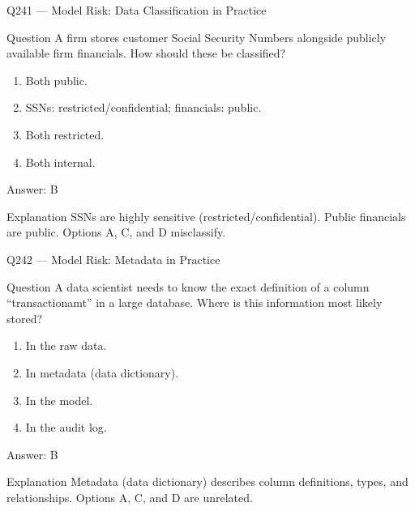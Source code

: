 \documentclass[aspectratio=169,8pt]{beamer}
\begin{document}
																											\begin{frame}{Q241 --- Model Risk: Data Classification in Practice}
																												\begin{block}{Question}
																													A firm stores customer Social Security Numbers alongside publicly available firm financials. How should these be classified?
																													\begin{enumerate}
																														\item Both public.
																														\item SSNs: restricted/confidential; financials: public.
																														\item Both restricted.
																														\item Both internal.
																													\end{enumerate}  \end{block}
																													\begin{exampleblock}{Answer: B}\end{exampleblock}
																													\begin{block}{Explanation}
																														SSNs are highly sensitive (restricted/confidential). Public financials are public. Options A, C, and D misclassify.
																													\end{block}
																												\end{frame}
																												
																												\begin{frame}{Q242 --- Model Risk: Metadata in Practice}
																													\begin{block}{Question}
																														A data scientist needs to know the exact definition of a column ``transactionamt'' in a large database. Where is this information most likely stored?
																														\begin{enumerate}
																															\item In the raw data.
																															\item In metadata (data dictionary).
																															\item In the model.
																															\item In the audit log.
																														\end{enumerate}  \end{block}
																														\begin{exampleblock}{Answer: B}\end{exampleblock}
																														\begin{block}{Explanation}
																															Metadata (data dictionary) describes column definitions, types, and relationships. Options A, C, and D are unrelated.
																														\end{block}
																													\end{frame}
																													
\end{document}
